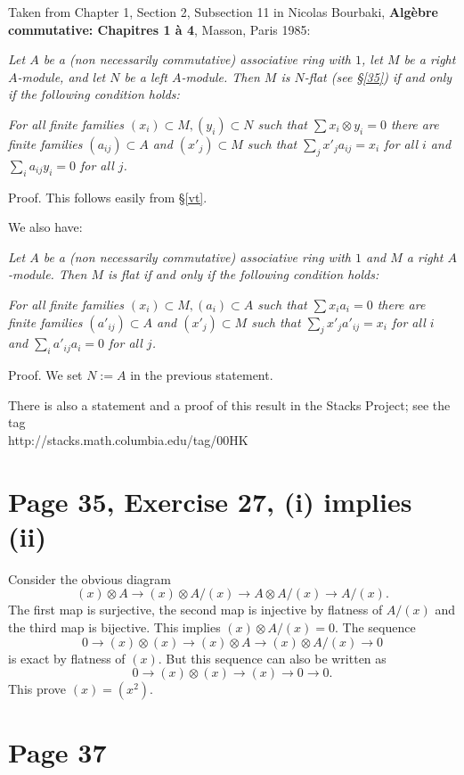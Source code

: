 \documentclass[12pt]{article}
\begin{document}
Taken from Chapter 1, Section 2, Subsection 11 in Nicolas Bourbaki, \textbf{Algèbre commutative: Chapitres 1 à 4}, Masson, Paris 1985:

\emph{Let $A$ be a (non necessarily commutative) associative ring with $1$, let $M$ be a right $A$-module, and let $N$ be a left $A$-module. Then $M$ is $N$-flat (see \S\ref{35}) if and only if the following condition holds:}

\emph{For all finite families $(x_i)\subset M,(y_i)\subset N$ such that $\sum x_i\otimes y_i=0$ there are finite families $(a_{ij})\subset A$ and $(x'_j)\subset M$ such that $\sum_jx'_ja_{ij}=x_i$ for all $i$ and $\sum_ia_{ij}y_i=0$ for all $j$.}

Proof. This follows easily from \S\ref{vt}. 

We also have:

\emph{Let $A$ be a (non necessarily commutative) associative ring with $1$ and $M$ a right $A$-module. Then $M$ is flat if and only if the following condition holds:}

\emph{For all finite families $(x_i)\subset M,(a_i)\subset A$ such that $\sum x_ia_i=0$ there are finite families $(a'_{ij})\subset A$ and $(x'_j)\subset M$ such that $\sum_jx'_ja'_{ij}=x_i$ for all $i$ and $\sum_ia'_{ij}a_i=0$ for all $j$.}

Proof. We set $N:=A$ in the previous statement.

There is also a statement and a proof of this result in the Stacks Project; see the tag\\ http://stacks.math.columbia.edu/tag/00HK

\section{Page 35, Exercise 27, (i) implies (ii)}%

Consider the obvious diagram
$$
(x)\otimes A\to(x)\otimes A/(x)\to A\otimes A/(x)\to A/(x). 
$$ 
The first map is surjective, the second map is injective by flatness of $A/(x)$ and the third map is bijective. This implies $(x)\otimes A/(x)=0$. The sequence 
$$
0\to(x)\otimes(x)\to(x)\otimes A\to(x)\otimes A/(x)\to0
$$ 
is exact by flatness of $(x)$. But this sequence can also be written as 
$$
0\to(x)\otimes(x)\to(x)\to0\to0.
$$ 
This prove $(x)=(x^2)$.

\section{Page 37}%
\end{document}
